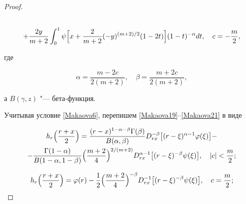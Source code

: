 \begin{proof}
\begin{multline}
\\

\label{Makaova21} 

+\frac{2y}{m+2}

\int _0^1 

\psi \Bigl[ x+\frac{2}{m+2}(-y)^{({m+2})/{2}}(1-2t)\Bigr]

(1-t)^{-\alpha}dt, \quad  c=-\frac{m}{2},

\end{multline} 

где 

\[

\alpha=\frac{m-2c}{2(m+2)}, \quad \beta=\frac{m+2c}{2(m+2)},

\]

а $B(\gamma, z)$  "--- бета-функция.  



Учитывая условие \eqref{Makaova6}, перепишем \eqref{Makaova19}--\eqref{Makaova21} в виде

\begin{multline} 

h_r\Bigl(\frac{r+x}{2} \Bigr)=

\frac{(r-x)^{1-\alpha-\beta} \Gamma(\beta)}{B(\alpha, \beta)} D^{-\beta}_{rx}

\bigl[ (r-\xi)^{\alpha-1} \varphi(\xi) \bigr]-

\\

\label{Makaova22} 

-\frac{\Gamma(1-\alpha)}{B(1-\alpha, 1-\beta)} 

\Bigl( \frac{m+2}{4} \Bigr)^{{2}/({m+2}) }

 D^{\alpha-1}_{rx}

\bigl[ (r-\xi)^{-\beta} \psi(\xi) \bigr],  \quad   |c|<\frac{m}{2};

\end{multline}

\begin{gather}

\label{Makaova24} 

h_r\Bigl(\frac{r+x}{2} \Bigr)=

\varphi(r)-\frac{1}{2} 

\Bigl( \frac{m+2}{4} \Bigr)^{-\beta} 

 D^{-1}_{rx}   \bigl[(r-\xi)^{-\beta} \psi(\xi)\bigr],  \quad  c=\frac{m}{2};

\\

\label{Makaova24} 


\end{gather}
\end{proof}
